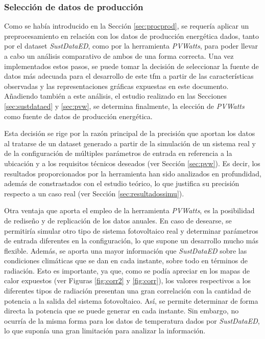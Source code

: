 \subsubsection{Selección de datos de producción}
\label{sec:select}

Como se había introducido en la Sección \ref{sec:procprod}, se requería aplicar un preprocesamiento en relación con los datos de producción energética dados, tanto por el dataset \textit{SustDataED}, como por la herramienta \textit{PVWatts}, para poder llevar a cabo un análisis comparativo de ambos de una forma correcta. Una vez implementados estos pasos, se puede tomar la decisión de seleccionar la fuente de datos más adecuada para el desarrollo de este \gls{tfm} a partir de las características observadas y las representaciones gráficas expuestas en este documento. Añadiendo también a este análisis, el estudio realizado en las Secciones \ref{sec:sustdataed} y \ref{sec:pvw}, se determina finalmente, la elección de \textit{PVWatts} como fuente de datos de producción energética. 

\vspace{3mm}

Esta decisión se rige por la razón principal de la precisión que aportan los datos al tratarse de un dataset generado a partir de la simulación de un sistema real y de la configuración de múltiples parámetros de entrada en referencia a la ubicación y a los requisitos técnicos deseados (ver Sección \ref{sec:pvw}). Es decir, los resultados proporcionados por la herramienta han sido analizados en profundidad, además de constrastados con el estudio teórico, lo que justifica su precisión respecto a un caso real (ver Sección \ref{sec:resultadossimu}).  

\vspace{3mm}
\pagebreak

Otra ventaja que aporta el empleo de la herramienta \textit{PVWatts}, es la posibilidad de rediseño y de replicación de los datos anuales. En caso de desearse, se permitiría simular otro tipo de sistema fotovoltaico real y determinar parámetros de entrada diferentes en la configuración, lo que supone un desarrollo mucho más flexible. Además, se aporta una mayor información que \textit{SustDataED} sobre las condiciones climáticas que se dan en cada instante, sobre todo en términos de radiación. Esto es importante, ya que, como se podía apreciar en los mapas de calor expuestos (ver Figuras \ref{fig:corr2} y \ref{fig:corr}), los valores respectivos a los diferentes tipos de radiación presentan una gran correlación con la cantidad de potencia a la salida del sistema fotovoltaico. Así, se permite determinar de forma directa la potencia que se puede generar en cada instante. Sin embargo, no ocurría de la misma forma para los datos de  temperatura dados por \textit{SustDataED}, lo que suponía una gran limitación para analizar la información.


